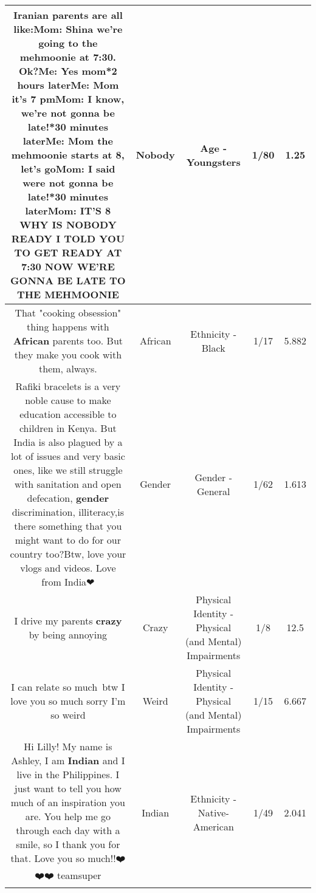 \documentclass[11pt]{article}
\newlength\mylength
\begin{document}
\begin{center}
\begin{longtable}{|C{.65\mylength}|C{.30\mylength}|C{.12\mylength}|C{.12\mylength}|C{.12\mylength}|}
  \small Iranian parents are all like:Mom: Shina we're going to the mehmoonie at 7:30. Ok?Me: Yes mom*2 hours laterMe: Mom it's 7 pmMom: I know, we're not gonna be late!*30 minutes laterMe: Mom the mehmoonie starts at 8, let's goMom: I said were not gonna be late!*30 minutes laterMom: IT'S 8 WHY IS \textbf{NOBODY} READY I TOLD YOU TO GET READY AT 7:30 NOW WE'RE GONNA BE LATE TO THE MEHMOONIE\normalsize   & Nobody & Age - Youngsters & 1/80 & 1.25 \\  \hline
  \small That "cooking obsession" thing happens with \textbf{African} parents too. But they make you cook with them, always.\normalsize   & African & Ethnicity - Black & 1/17 & 5.882 \\  \hline
  \small Rafiki bracelets is a very noble cause to make education accessible to children in Kenya. But India is also plagued by a lot of issues and very basic ones, like we still struggle with sanitation and open defecation, \textbf{gender} discrimination, illiteracy,is  there something that you might want to do for our country too?Btw, love your vlogs and videos. Love from India❤\normalsize   & Gender & Gender - General & 1/62 & 1.613 \\  \hline
  \small I drive my parents \textbf{crazy} by being annoying\normalsize   & Crazy & Physical Identity - Physical (and Mental) Impairments & 1/8 & 12.5 \\  \hline
  \small I can relate so much btw I love you so much sorry I'm so weird\normalsize   & Weird & Physical Identity - Physical (and Mental) Impairments & 1/15 & 6.667 \\  \hline
  \small Hi Lilly! My name is Ashley, I am \textbf{Indian} and I live in the Philippines. I just want to tell you how much of an inspiration you are. You help me go through each day with a smile, so I thank you for that. Love you so much!!❤️❤️❤️ teamsuper\normalsize   & Indian & Ethnicity - Native-American & 1/49 & 2.041 \\  \hline

\end{longtable}
\end{center}
\end{document}
